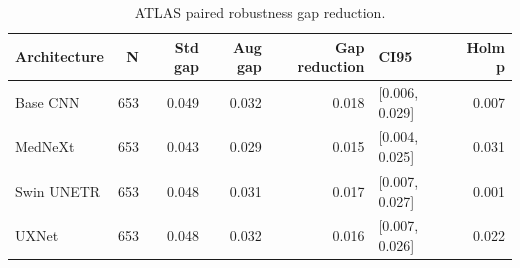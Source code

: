 \begin{table}
\caption{ATLAS paired robustness gap reduction.}
\label{tab:atlas_gap_reduction}
\begin{tabular}{lrrrrlr}
\toprule
Architecture & N & Std gap & Aug gap & Gap reduction & CI95 & Holm p \\
\midrule
Base CNN & 653 & 0.049 & 0.032 & 0.018 & [0.006, 0.029] & 0.007 \\
MedNeXt & 653 & 0.043 & 0.029 & 0.015 & [0.004, 0.025] & 0.031 \\
Swin UNETR & 653 & 0.048 & 0.031 & 0.017 & [0.007, 0.027] & 0.001 \\
UXNet & 653 & 0.048 & 0.032 & 0.016 & [0.007, 0.026] & 0.022 \\
\bottomrule
\end{tabular}
\end{table}

